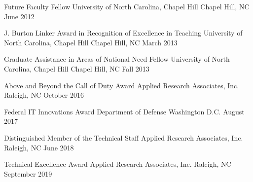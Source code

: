 
\begin{cventries}

  \cventry
    {Future Faculty Fellow} %
    {University of North Carolina, Chapel Hill} %
    {Chapel Hill, NC} %
    {June 2012} %
     {
     }

  \cventry
    {J. Burton Linker Award in Recognition of Excellence in Teaching} %
    {University of North Carolina, Chapel Hill} %
    {Chapel Hill, NC} %
    {March 2013} %
     {
     }

  \cventry
    {Graduate Assistance in Areas of National Need Fellow} %
    {University of North Carolina, Chapel Hill} %
    {Chapel Hill, NC} %
    {Fall 2013} %
     {
     }

  \cventry
    {Above and Beyond the Call of Duty Award} %
    {Applied Research Associates, Inc.} %
    {Raleigh, NC} %
    {October 2016} %
     {
     }

  \cventry
    {Federal IT Innovations Award} %
    {Department of Defense} %
    {Washington D.C.} %
    {August 2017} %
     {
     }


  \cventry
    {Distinguished Member of the Technical Staff} %
    {Applied Research Associates, Inc.} %
    {Raleigh, NC} %
    {June 2018} %
     {
     }

  \cventry
    {Technical Excellence Award} %
    {Applied Research Associates, Inc.} %
    {Raleigh, NC} %
    {September 2019} %
     {
     }



\end{cventries}
